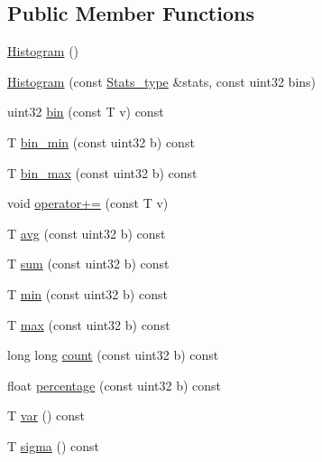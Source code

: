 \subsection*{\-Public \-Member \-Functions}
\begin{DoxyCompactItemize}
\item 
\hyperlink{structnih_1_1_histogram_a02fc7d53135317aa09987e844dc12b62}{\-Histogram} ()
\item 
\hyperlink{structnih_1_1_histogram_a3ec4838b404f190ba70268a653ceb1b0}{\-Histogram} (const \hyperlink{structnih_1_1_stats}{\-Stats\-\_\-type} \&stats, const uint32 bins)
\item 
uint32 \hyperlink{structnih_1_1_histogram_a2019e21e8331552e11868f2ebb7e88ed}{bin} (const \-T v) const 
\item 
\-T \hyperlink{structnih_1_1_histogram_a7b0fc3739f04f28b32fb11dbaec17a98}{bin\-\_\-min} (const uint32 b) const 
\item 
\-T \hyperlink{structnih_1_1_histogram_ad81875d21a2c8e79bbb0890ab0e6a022}{bin\-\_\-max} (const uint32 b) const 
\item 
void \hyperlink{structnih_1_1_histogram_a93fd01eeb1081763157d7da55acdf0ae}{operator+=} (const \-T v)
\item 
\-T \hyperlink{structnih_1_1_histogram_af5ea4cf95bd6f513637185ef459227ed}{avg} (const uint32 b) const 
\item 
\-T \hyperlink{structnih_1_1_histogram_ac11bb3aaf34b80cf1b0197cfaec6ad13}{sum} (const uint32 b) const 
\item 
\-T \hyperlink{structnih_1_1_histogram_a34b0697ee7f959f9b581f18bbecfba32}{min} (const uint32 b) const 
\item 
\-T \hyperlink{structnih_1_1_histogram_aad9fcd509dfb9867bef691171eeddf07}{max} (const uint32 b) const 
\item 
long long \hyperlink{structnih_1_1_histogram_a93961d96035232c3a8068188c5b94478}{count} (const uint32 b) const 
\item 
float \hyperlink{structnih_1_1_histogram_add147c7cfa62c368150ef680a243e9f3}{percentage} (const uint32 b) const 
\item 
\-T \hyperlink{structnih_1_1_histogram_af8d91f889c49450bddc82c87c96fc60b}{var} () const 
\item 
\-T \hyperlink{structnih_1_1_histogram_afbcee663ea55aa97115f4f8ef1bde8a1}{sigma} () const 
\end{DoxyCompactItemize}
